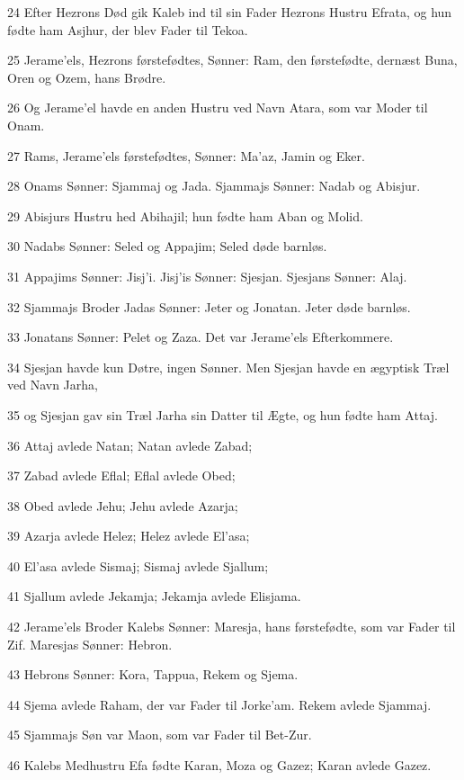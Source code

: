 \par 24 Efter Hezrons Død gik Kaleb ind til sin Fader Hezrons Hustru Efrata, og hun fødte ham Asjhur, der blev Fader til Tekoa.
\par 25 Jerame'els, Hezrons førstefødtes, Sønner: Ram, den førstefødte, dernæst Buna, Oren og Ozem, hans Brødre.
\par 26 Og Jerame'el havde en anden Hustru ved Navn Atara, som var Moder til Onam.
\par 27 Rams, Jerame'els førstefødtes, Sønner: Ma'az, Jamin og Eker.
\par 28 Onams Sønner: Sjammaj og Jada. Sjammajs Sønner: Nadab og Abisjur.
\par 29 Abisjurs Hustru hed Abihajil; hun fødte ham Aban og Molid.
\par 30 Nadabs Sønner: Seled og Appajim; Seled døde barnløs.
\par 31 Appajims Sønner: Jisj'i. Jisj'is Sønner: Sjesjan. Sjesjans Sønner: Alaj.
\par 32 Sjammajs Broder Jadas Sønner: Jeter og Jonatan. Jeter døde barnløs.
\par 33 Jonatans Sønner: Pelet og Zaza. Det var Jerame'els Efterkommere.
\par 34 Sjesjan havde kun Døtre, ingen Sønner. Men Sjesjan havde en ægyptisk Træl ved Navn Jarha,
\par 35 og Sjesjan gav sin Træl Jarha sin Datter til Ægte, og hun fødte ham Attaj.
\par 36 Attaj avlede Natan; Natan avlede Zabad;
\par 37 Zabad avlede Eflal; Eflal avlede Obed;
\par 38 Obed avlede Jehu; Jehu avlede Azarja;
\par 39 Azarja avlede Helez; Helez avlede El'asa;
\par 40 El'asa avlede Sismaj; Sismaj avlede Sjallum;
\par 41 Sjallum avlede Jekamja; Jekamja avlede Elisjama.
\par 42 Jerame'els Broder Kalebs Sønner: Maresja, hans førstefødte, som var Fader til Zif. Maresjas Sønner: Hebron.
\par 43 Hebrons Sønner: Kora, Tappua, Rekem og Sjema.
\par 44 Sjema avlede Raham, der var Fader til Jorke'am. Rekem avlede Sjammaj.
\par 45 Sjammajs Søn var Maon, som var Fader til Bet-Zur.
\par 46 Kalebs Medhustru Efa fødte Karan, Moza og Gazez; Karan avlede Gazez.
